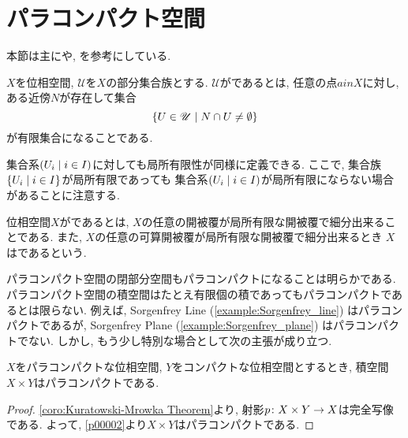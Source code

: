 \documentclass[uplatex, dvipdfmx, a4paper, 12pt, class=jsbook, crop=false]{standalone}
\begin{document}
\section{パラコンパクト空間}
\label{sec:paracompact-spaces}

\newcommand{\starset}[2]{\mathrm{St}\left(#1 , \: #2\right)}
\newcommand{\sstarset}[3]{\mathrm{St}^{#1}\left(#2 , \: #3 \right)}

\begin{source}
	本節は主に\cite[Chapter 5]{Engelking1989GT}や\cite[第8章]{Morita1981ja}, \cite[第3章]{KodamaNagami1974ja}を参考にしている.
\end{source}

\begin{definition}
	$X$を位相空間, $\mathscr{U}$を$X$の部分集合族とする.
	$\mathscr{U}$がであるとは,
	任意の点$a in X$に対し, ある近傍$N$が存在して集合
		\[\setcomp{U \in \mathscr{U}}{N \cap U \neq \emptyset}\]
	が有限集合になることである.
\end{definition}

集合系$\setfamily{U_i}{i \in I}$に対しても局所有限性が同様に定義できる.
ここで,
集合族$\setcomp{U_i}{i \in I}$が局所有限であっても
集合系$\setfamily{U_i}{i \in I}$が局所有限にならない場合があることに注意する.

\begin{definition}
	位相空間$ X $がであるとは,
	$ X $の任意の開被覆が局所有限な開被覆で細分出来ることである.
	また, $ X $の任意の可算開被覆が局所有限な開被覆で細分出来るとき
	$ X $はであるという.
\end{definition}

パラコンパクト空間の閉部分空間もパラコンパクトになることは明らかである.
パラコンパクト空間の積空間はたとえ有限個の積であってもパラコンパクトであるとは限らない.
例えば, Sorgenfrey Line (\ref{example:Sorgenfrey_line}) はパラコンパクトであるが,
Sorgenfrey Plane (\ref{example:Sorgenfrey_plane}) はパラコンパクトでない.
しかし, もう少し特別な場合として次の主張が成り立つ.

\begin{proposition}
	\label{p00004}
	$ X $をパラコンパクトな位相空間, $ Y $をコンパクトな位相空間とするとき, 積空間$ X \times Y $はパラコンパクトである.
\end{proposition}

\begin{proof}
	\cref{coro:Kuratowski-Mrowka Theorem}より, 射影$ p\colon X \times Y\to X $は完全写像である.
	よって, \cref{p00002}より$ X \times Y $はパラコンパクトである.
\end{proof}
\end{document}
